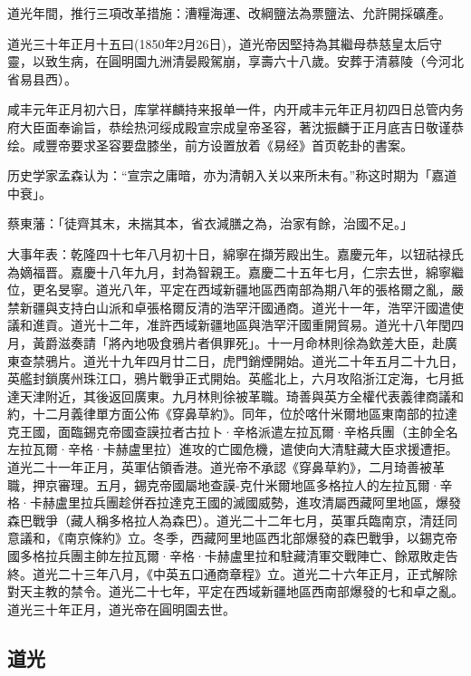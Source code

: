 道光年間，推行三項改革措施：漕糧海運、改綱鹽法為票鹽法、允許開採礦產。

道光三十年正月十五曰(1850年2月26日)，道光帝因堅持為其繼母恭慈皇太后守靈，以致生病，在圓明園九洲清晏殿駕崩，享壽六十八歲。安葬于清慕陵（今河北省易县西）。

咸丰元年正月初六日，库掌祥麟持来报单一件，内开咸丰元年正月初四日总管内务府大臣面奉谕旨，恭绘热河绥成殿宣宗成皇帝圣容，著沈振麟于正月底吉日敬谨恭绘。咸豐帝要求圣容要盘膝坐，前方设置放着《易经》首页乾卦的書案。

历史学家孟森认为：“宣宗之庸暗，亦为清朝入关以来所未有。”称这时期为「嘉道中衰」。

蔡東藩：「徒齊其末，未揣其本，省衣減膳之為，治家有餘，治國不足。」

大事年表：乾隆四十七年八月初十日，綿寧在擷芳殿出生。嘉慶元年，以钮祜禄氏為嫡福晋。嘉慶十八年九月，封為智親王。嘉慶二十五年七月，仁宗去世，綿寧繼位，更名旻寧。道光八年，平定在西域新疆地區西南部為期八年的張格爾之亂，嚴禁新疆與支持白山派和卓張格爾反清的浩罕汗國通商。道光十一年，浩罕汗國遣使議和進貢。道光十二年，准許西域新疆地區與浩罕汗國重開貿易。道光十八年閏四月，黃爵滋奏請「將內地吸食鴉片者俱罪死」。十一月命林則徐為欽差大臣，赴廣東查禁鴉片。道光十九年四月廿二日，虎門銷煙開始。道光二十年五月二十九日，英艦封鎖廣州珠江口，鴉片戰爭正式開始。英艦北上，六月攻陷浙江定海，七月抵達天津附近，其後返回廣東。九月林則徐被革職。琦善與英方全權代表義律商議和約，十二月義律單方面公佈《穿鼻草約》。同年，位於喀什米爾地區東南部的拉達克王國，面臨錫克帝國查謨拉者古拉卜·辛格派遣左拉瓦爾·辛格兵團（主帥全名左拉瓦爾·辛格·卡赫盧里拉）進攻的亡國危機，遣使向大清駐藏大臣求援遭拒。道光二十一年正月，英軍佔領香港。道光帝不承認《穿鼻草約》，二月琦善被革職，押京審理。五月，錫克帝國屬地查謨-克什米爾地區多格拉人的左拉瓦爾·辛格·卡赫盧里拉兵團趁併吞拉達克王國的滅國威勢，進攻清屬西藏阿里地區，爆發森巴戰爭（藏人稱多格拉人為森巴）。道光二十二年七月，英軍兵臨南京，清廷同意議和，《南京條約》立。冬季，西藏阿里地區西北部爆發的森巴戰爭，以錫克帝國多格拉兵團主帥左拉瓦爾·辛格·卡赫盧里拉和駐藏清軍交戰陣亡、餘眾敗走告終。道光二十三年八月，《中英五口通商章程》立。道光二十六年正月，正式解除對天主教的禁令。道光二十七年，平定在西域新疆地區西南部爆發的七和卓之亂。道光三十年正月，道光帝在圓明園去世。

\subsection{道光}

